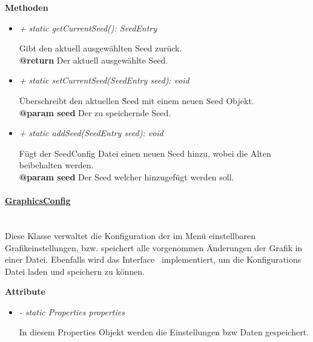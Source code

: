             \textbf{Methoden}					
            \begin{itemize}
                \item \textit{+ {static} getCurrentSeed(): SeedEntry}
                    \begin{leftbar}[0.9\linewidth]
                        Gibt den aktuell ausgewählten Seed zurück.\\
                        \textbf{@return} Der aktuell ausgewählte Seed.
                    \end{leftbar}
                \item \textit{+ {static} setCurrentSeed(SeedEntry seed): void}
                    \begin{leftbar}[0.9\linewidth]
                        Überschreibt den aktuellen Seed mit einem neuen Seed Objekt.\\
                        \textbf{@param seed} Der zu speichernde Seed.
                    \end{leftbar}
                \item \textit{+ {static} addSeed(SeedEntry seed): void}
                    \begin{leftbar}[0.9\linewidth]
                        Fügt der SeedConfig Datei einen neuen Seed hinzu, wobei die 
                        Alten beibehalten werden.\\
                        \textbf{@param seed} Der Seed welcher hinzugefügt werden soll.
                    \end{leftbar}
            \end{itemize}

        \pagebreak
        \paragraph{\underline{GraphicsConfig}} \mbox{}\\
            Diese Klasse verwaltet die Konfiguration der im Menü einstellbaren 
            Grafikeinstellungen, bzw. speichert alle vorgenommen Änderungen der
            Grafik in einer Datei. 
            Ebenfalls wird das Interface~ implementiert, um die Konfigurations Datei
            laden und speichern zu können. \par    
                    
            \textbf{Attribute}
            \begin{itemize}
                \item \textit{- {static} Properties properties}
                    \begin{leftbar}[0.9\linewidth]
                        In diesem Properties Objekt werden die Einstellungen bzw Daten 
                        gespeichert.
                    \end{leftbar}
            \end{itemize}
            
